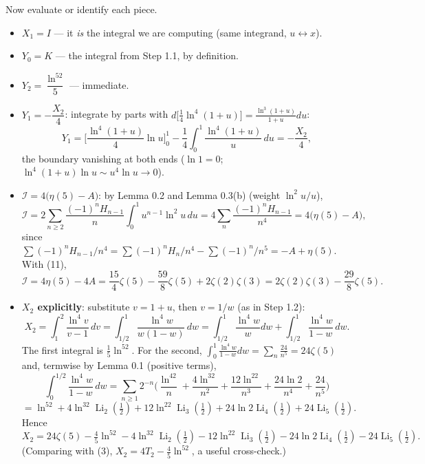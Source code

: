 \documentclass[11pt]{article}
\theoremstyle{remark}
\begin{document}
Now evaluate or identify each piece.

\begin{itemize}
\item \textbf{$X_1=I$} --- it \textit{is} the integral we are computing (same integrand, $u\leftrightarrow x$).
\item \textbf{$Y_0=K$} --- the integral from Step 1.1, by definition.
\item \textbf{$Y_2=\dfrac{\ln^52}{5}$} --- immediate.
\item \textbf{$Y_1=-\dfrac{X_2}{4}$}: integrate by parts with $d\big[\tfrac14\ln^4(1+u)\big]
  =\frac{\ln^3(1+u)}{1+u}du$:
  \[
  Y_1=\Big[\frac{\ln^4(1+u)}{4}\ln u\Big]_0^1-\frac14\int_0^1\frac{\ln^4(1+u)}{u}\,du=-\frac{X_2}4 ,
  \]
  the boundary vanishing at both ends ($\ln 1=0$; $\ln^4(1+u)\ln u\sim u^4\ln u\to0$).
\item \textbf{$\mathcal I=4\big(\eta(5)-A\big)$}: by Lemma 0.2 and Lemma 0.3(b) (weight $\ln^2u/u$),
  \[
  \mathcal I=2\sum_{n\ge2}\frac{(-1)^nH_{n-1}}{n}\int_0^1u^{n-1}\ln^2u\,du
  =4\sum_{n}\frac{(-1)^nH_{n-1}}{n^4}
  =4\Big(\eta(5)-A\Big),
  \]
  since $\sum(-1)^nH_{n-1}/n^4=\sum(-1)^nH_n/n^4-\sum(-1)^n/n^5=-A+\eta(5)$. With (11),
  \begin{equation}
  \mathcal I=4\eta(5)-4A=\frac{15}{4}\zeta(5)-\frac{59}{8}\zeta(5)+2\zeta(2)\zeta(3)
  =2\zeta(2)\zeta(3)-\frac{29}{8}\zeta(5). \tag{15}
  \end{equation}
\item \textbf{$X_2$ explicitly}: substitute $v=1+u$, then $v=1/w$ (as in Step 1.2):
  \[
  X_2=\int_1^2\frac{\ln^4v}{v-1}\,dv=\int_{1/2}^1\frac{\ln^4w}{w(1-w)}\,dw
  =\int_{1/2}^1\frac{\ln^4w}{w}dw+\int_{1/2}^1\frac{\ln^4w}{1-w}\,dw .
  \]
  The first integral is $\tfrac15\ln^52$. For the second, $\int_0^1\frac{\ln^4w}{1-w}dw
  =\sum_n\frac{24}{n^5}=24\zeta(5)$ and, termwise by Lemma 0.1 (positive terms),
  \[
  \int_0^{1/2}\frac{\ln^4w}{1-w}\,dw
  =\sum_{n\ge1}2^{-n}\Big(\frac{\ln^42}{n}+\frac{4\ln^32}{n^2}+\frac{12\ln^22}{n^3}
  +\frac{24\ln2}{n^4}+\frac{24}{n^5}\Big)
  \]
  \[
  =\ln^52+4\ln^32\operatorname{Li}_2(\tfrac12)+12\ln^22\operatorname{Li}_3(\tfrac12)
  +24\ln2\operatorname{Li}_4(\tfrac12)+24\operatorname{Li}_5(\tfrac12).
  \]
  Hence
  \begin{equation}
  X_2=24\zeta(5)-\tfrac45\ln^52-4\ln^32\operatorname{Li}_2(\tfrac12)
  -12\ln^22\operatorname{Li}_3(\tfrac12)-24\ln2\operatorname{Li}_4(\tfrac12)
  -24\operatorname{Li}_5(\tfrac12). \tag{16}
  \end{equation}
  (Comparing with (3), $X_2=4T_2-\tfrac45\ln^52$, a useful cross-check.)
\end{itemize}
\end{document}
